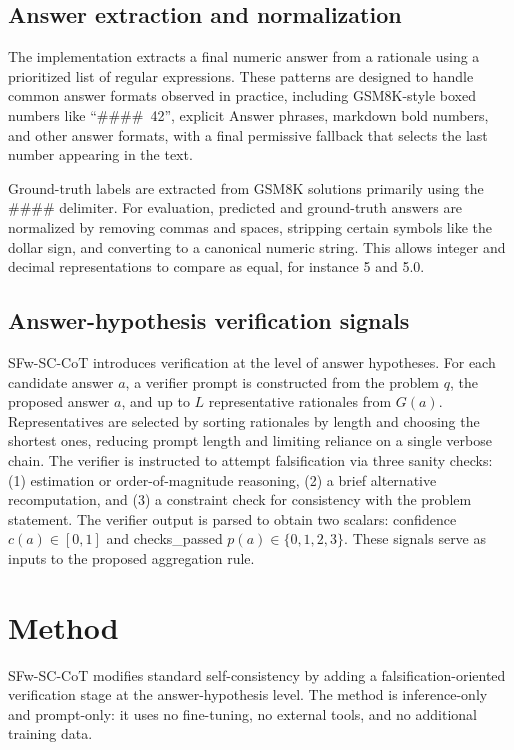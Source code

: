 \documentclass[journal,article,accept,pdftex,moreauthors]{Definitions/mdpi}
\begin{document}
\subsection{Answer extraction and normalization}
The implementation extracts a final numeric answer from a rationale using a prioritized list of regular expressions. These patterns are designed to handle common answer formats observed in practice, including GSM8K-style boxed numbers like \mbox{``\#\#\#\# 42''}, explicit Answer phrases, markdown bold numbers, and other answer formats, with a final permissive fallback that selects the last number appearing in the text.

Ground-truth labels are extracted from GSM8K solutions primarily using the \#\#\#\# delimiter. For evaluation, predicted and ground-truth answers are normalized by removing commas and spaces, stripping certain symbols like the dollar sign, and converting to a canonical numeric string. This allows integer and decimal representations to compare as equal, for instance 5 and 5.0.

\subsection{Answer-hypothesis verification signals}
SFw-SC-CoT introduces verification at the level of answer hypotheses. For each candidate answer $a$, a verifier prompt is constructed from the problem $q$, the proposed answer $a$, and up to $L$ representative rationales from $G(a)$. Representatives are selected by sorting rationales by length and choosing the shortest ones, reducing prompt length and limiting reliance on a single verbose chain. The verifier is instructed to attempt falsification via three sanity checks: (1) estimation or order-of-magnitude reasoning, (2) a brief alternative recomputation, and (3) a constraint check for consistency with the problem statement. The verifier output is parsed to obtain two scalars: confidence $c(a) \in [0,1]$ and checks\_passed $p(a) \in \{0,1,2,3\}$. These signals serve as inputs to the proposed aggregation rule.

\section{Method}

SFw-SC-CoT modifies standard self-consistency by adding a falsification-oriented verification stage at the answer-hypothesis level. The method is inference-only and prompt-only: it uses no fine-tuning, no external tools, and no additional training data.
\end{document}
